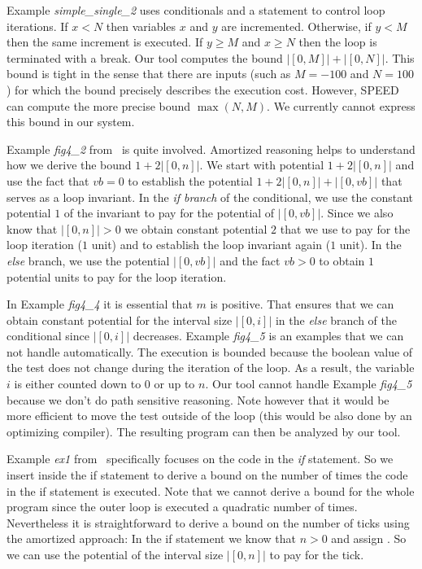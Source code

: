 \documentclass[nocopyrightspace,preprint,pldi]{sigplanconf-pldi15}
\begin{document}
{Example \emph{simple\_single\_2} uses conditionals and a 
statement to control loop iterations.  If $x<N$ then variables $x$ and
$y$ are incremented.  Otherwise, if $y<M$ then the same increment is
executed.  If $y\geq M$ and $x\geq N$ then the loop is terminated with
a break.  Our tool computes the bound $|[0, M]| + |[0, N]|$.
This bound is tight in the sense that there are inputs (such as $M =
-100$ and $N = 100$) for which the bound precisely describes the
execution cost.  However, SPEED can compute the more precise bound
$\max(N,M)$.  We currently cannot express this bound in our system.

Example \emph{fig4\_2} from~\cite{GulwaniJK09} is quite involved.
Amortized reasoning helps to understand how we derive the bound $1 +
2|[0, n]|$.  We start with potential $1 + 2|[0, n]|$ and use the fact
that $vb=0$ to establish the potential $1 + 2|[0, n]| + |[0,vb]|$ that
serves as a loop invariant.  In the \emph{if branch} of the
conditional, we use the constant potential $1$ of the invariant to pay
for the potential of $|[0,vb]|$.  Since we also know that $|[0, n]|>0$
we obtain constant potential $2$ that we use to pay for the loop
iteration ($1$ unit) and to establish the loop invariant again ($1$
unit).  In the \emph{else} branch, we use the potential $|[0,vb]|$
and the fact $vb>0$ to obtain $1$ potential units to pay for the
loop iteration.

In Example \emph{fig4\_4} it is essential that $m$ is positive.  That
ensures that we can obtain constant potential for the interval size
$|[0,i]|$ in the \emph{else} branch of the conditional since $|[0,i]|$
decreases.  Example \emph{fig4\_5} is an examples that we can not
handle automatically.  The execution is bounded because the boolean
value of the test  does not change during the iteration
of the loop.  As a result, the variable $i$ is either counted down to
$0$ or up to $n$.  Our tool cannot handle Example \emph{fig4\_5}
because we don't do path sensitive reasoning.  Note however that it
would be more efficient to move the test  outside of
the loop (this would be also done by an optimizing compiler).  The
resulting program can then be analyzed by our tool.

Example \emph{ex1} from~\cite{GulwaniZ10} specifically focuses on the
code in the \emph{if} statement.  So we
insert  inside the if statement to derive a bound on
the number of times the code in the if statement is executed.  Note
that we cannot derive a bound for the whole program since the outer
loop is executed a quadratic number of times.  Nevertheless it is
straightforward to derive a bound on the number of ticks using the
amortized approach: In the if statement we know that $n>0$ and assign
.  So we can use the potential of the interval size $|[0,n]|$
to pay for the tick.

}
\end{document}
